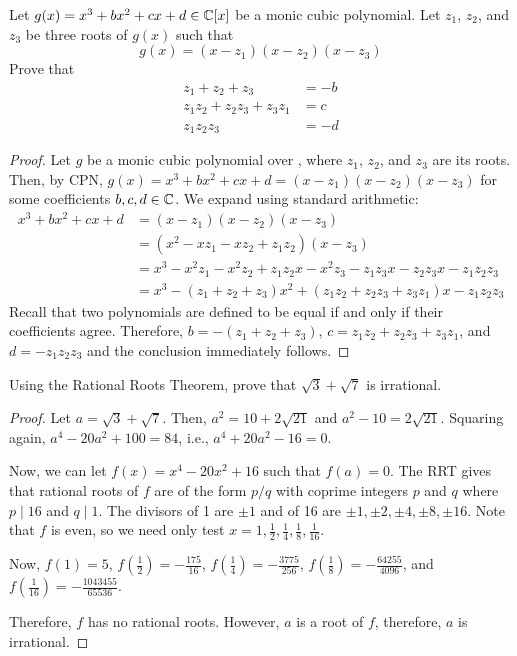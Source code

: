 \documentclass{agony}
\begin{document}
\question Let $g(x)=x^3+bx^2+cx+d\in\mathbb{C}[x]$ be a monic cubic polynomial.
Let $z_1$, $z_2$, and $z_3$ be three roots of $g(x)$ such that
\[ g(x) = (x-z_1)(x-z_2)(x-z_3) \]
Prove that \begin{align*}
  z_1 + z_2 + z_3          & = -b \\
  z_1z_2 + z_2z_3 + z_3z_1 & = c  \\
  z_1z_2z_3                & = -d
\end{align*}
\begin{proof}
  Let $g$ be a monic cubic polynomial over \C, where $z_1$, $z_2$, and $z_3$ are its roots.
  Then, by CPN, $g(x) = x^3 + bx^2 + cx + d = (x-z_1)(x-z_2)(x-z_3)$ for some coefficients $b,c,d\in\mathbb{C}$.
  We expand using standard arithmetic:
  \begin{align*}
    x^3 + bx^2 + cx + d & = (x-z_1)(x-z_2)(x-z_3)                                                    \\
                        & = (x^2 - xz_1 - xz_2 + z_1z_2)(x-z_3)                                      \\
                        & = x^3 - x^2z_1 - x^2z_2 + z_1z_2x - x^2z_3 - z_1z_3x - z_2z_3x - z_1z_2z_3 \\
                        & = x^3 - (z_1 + z_2 + z_3)x^2 + (z_1z_2 + z_2z_3 + z_3z_1)x - z_1z_2z_3
  \end{align*}
  Recall that two polynomials are defined to be equal if and only if their coefficients agree.
  Therefore, $b = -(z_1+z_2+z_3)$, $c = z_1z_2 + z_2z_3 + z_3z_1$, and $d = -z_1z_2z_3$
  and the conclusion immediately follows.
\end{proof}


\question Using the Rational Roots Theorem, prove that $\sqrt 3 + \sqrt 7$ is irrational.
\begin{proof}
  Let $a = \sqrt 3 + \sqrt 7$.
  Then, $a^2 = 10 + 2\sqrt{21}$ and $a^2 - 10 = 2\sqrt{21}$.
  Squaring again, $a^4 - 20a^2 + 100 = 84$, i.e., $a^4 + 20a^2 - 16 = 0$.

  Now, we can let $f(x) = x^4 - 20x^2 + 16$ such that $f(a) = 0$.
  The RRT gives that rational roots of $f$ are of the form $p/q$ with coprime integers $p$ and $q$
  where $p \mid 16$ and $q \mid 1$. The divisors of 1 are $\pm1$ and of 16 are $\pm1,\pm2,\pm4,\pm8,\pm16$.
  Note that $f$ is even, so we need only test $x=1,\frac12,\frac14,\frac18,\frac1{16}$.

  Now, $f(1)=5$, $f(\frac12)=-\frac{175}{16}$, $f(\frac14)=-\frac{3775}{256}$,
  $f(\frac18)=-\frac{64255}{4096}$, and $f(\frac1{16})=-\frac{1043455}{65536}$.

  Therefore, $f$ has no rational roots. However, $a$ is a root of $f$, therefore, $a$ is irrational.
\end{proof}
\end{document}
